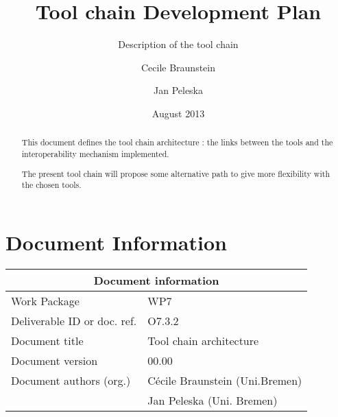 \documentclass{openetcs_report}
\begin{document}
\frontmatter
{}




\title{Tool chain Development Plan}

\subtitle{Description of the tool chain}

\date{August 2013}


\author{Cecile Braunstein \and Jan Peleska}







\begin{abstract}
This document defines the tool chain architecture : the links between
the tools and the interoperability mechanism implemented.

The present tool chain will propose some alternative path to give more
flexibility with the chosen tools.
\end{abstract}

\maketitle
\tableofcontents
\listoffiguresandtables

\newpage

\chapter{Document Information}
\begin{tabular}{|p{4.4cm}|p{8.7cm}|}
\hline
\multicolumn{2}{|c|}{Document information} \\
\hline
Work Package &  WP7  \\
Deliverable ID or doc. ref. & O7.3.2\\
\hline
Document title & Tool chain architecture \\
Document version & 00.00 \\
Document authors (org.)  & Cécile Braunstein  (Uni.Bremen)  \\
& Jan Peleska (Uni. Bremen)\\
\hline
\end{tabular}
\end{document}
